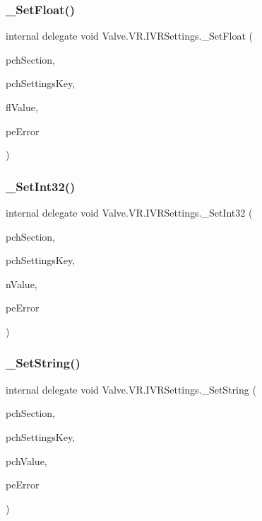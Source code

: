 \subsubsection{\texorpdfstring{\_SetFloat()}{\_SetFloat()}}
{\footnotesize\ttfamily internal delegate void Valve.\+V\+R.\+I\+V\+R\+Settings.\+\_\+\+Set\+Float (\begin{DoxyParamCaption}\item[{string}]{pch\+Section,  }\item[{string}]{pch\+Settings\+Key,  }\item[{float}]{fl\+Value,  }\item[{ref \mbox{\hyperlink{namespace_valve_1_1_v_r_aeab7722b211afc3885ed77faa931291f}{E\+V\+R\+Settings\+Error}}}]{pe\+Error }\end{DoxyParamCaption})}

\mbox{\label{struct_valve_1_1_v_r_1_1_i_v_r_settings_ae73ed83147f47177ed5d90efe0acd8bd}} 
\subsubsection{\texorpdfstring{\_SetInt32()}{\_SetInt32()}}
{\footnotesize\ttfamily internal delegate void Valve.\+V\+R.\+I\+V\+R\+Settings.\+\_\+\+Set\+Int32 (\begin{DoxyParamCaption}\item[{string}]{pch\+Section,  }\item[{string}]{pch\+Settings\+Key,  }\item[{int}]{n\+Value,  }\item[{ref \mbox{\hyperlink{namespace_valve_1_1_v_r_aeab7722b211afc3885ed77faa931291f}{E\+V\+R\+Settings\+Error}}}]{pe\+Error }\end{DoxyParamCaption})}

\mbox{\label{struct_valve_1_1_v_r_1_1_i_v_r_settings_a9609f80e0c236c65db99bcd997c0145b}} 
\subsubsection{\texorpdfstring{\_SetString()}{\_SetString()}}
{\footnotesize\ttfamily internal delegate void Valve.\+V\+R.\+I\+V\+R\+Settings.\+\_\+\+Set\+String (\begin{DoxyParamCaption}\item[{string}]{pch\+Section,  }\item[{string}]{pch\+Settings\+Key,  }\item[{string}]{pch\+Value,  }\item[{ref \mbox{\hyperlink{namespace_valve_1_1_v_r_aeab7722b211afc3885ed77faa931291f}{E\+V\+R\+Settings\+Error}}}]{pe\+Error }\end{DoxyParamCaption})}

